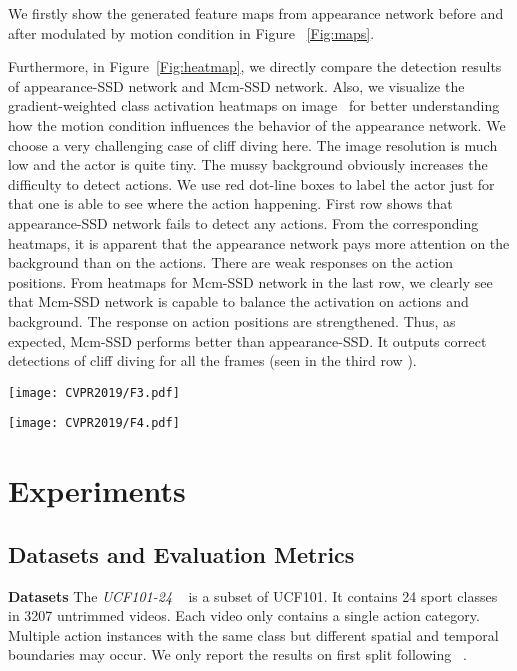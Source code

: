 \documentclass[10pt,twocolumn,letterpaper]{article}
\begin{document}
We firstly show the generated feature maps from appearance network before and after modulated by motion condition in Figure ~\ref{Fig:maps}. 

Furthermore, in Figure~\ref{Fig:heatmap}, we directly compare the detection results of appearance-SSD network and Mcm-SSD network. Also, we visualize the gradient-weighted class activation heatmaps on image~\cite{Zhou2015,Utk} for better understanding how the motion condition influences the behavior of the appearance network. We choose a very challenging case of cliff diving here. The image resolution is much low and the actor is quite tiny. The mussy background obviously increases the difficulty to detect actions. We use red dot-line boxes to label the actor just for that one is able to see where the action happening. First row shows that appearance-SSD network fails to detect any actions. From the corresponding heatmaps, it is apparent that the appearance network pays more attention on the background than on the actions. There are weak responses on the action positions. From heatmaps for Mcm-SSD network in the last row, we clearly see that Mcm-SSD network is capable to balance the activation on actions and background. The response on action positions are strengthened. Thus, as expected, Mcm-SSD performs better than appearance-SSD. It outputs correct detections of cliff diving for all the frames (seen in the third row ).     

\begin{figure*}[ht]
\centering
\texttt{[image: CVPR2019/F3.pdf]}
\caption{Visualization of the RGB feature maps from conv2 layer of appearance SSD network in the first row; Motion condition maps from MC Layer in the second rwo; Modulated features from conv2 layer of Mcm-SSD network in the last row. }
\label{Fig:maps}
\end{figure*}
\begin{figure*}[ht]
\centering
\texttt{[image: CVPR2019/F4.pdf]}
\caption{Visualization of detection results and heatmaps on conv4 layers from Appearance-SSD network (first two rows) and Mcm-SSD network (last two rows). }
\label{Fig:heatmap}
\end{figure*}

\section{Experiments}
 
\subsection{Datasets and Evaluation Metrics}
{\bf{Datasets}} The {\it{UCF101-24}} ~\cite{Soomro2012} is a subset of UCF101. It contains 24 sport classes in 3207 untrimmed videos. Each video only contains a single action category. Multiple action instances with the same class but different spatial and temporal boundaries may occur. We only report the results on first split following ~\cite{}. 
\end{document}
